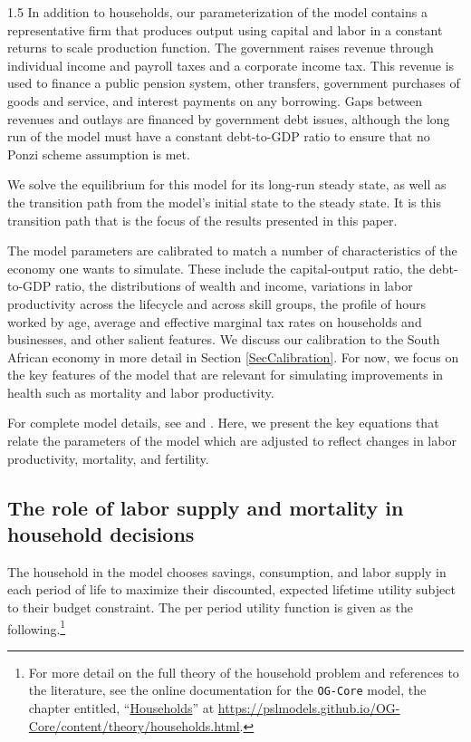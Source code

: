 \documentclass[letterpaper,12pt]{article}
\theoremstyle{definition}
\begin{document}
\begin{spacing}{1.5}
  In addition to households, our parameterization of the model contains a representative firm that produces output using capital and labor in a constant returns to scale production function.  The government raises revenue through individual income and payroll taxes and a corporate income tax.  This revenue is used to finance a public pension system, other transfers, government purchases of goods and service, and interest payments on any borrowing. Gaps between revenues and outlays are financed by government debt issues, although the long run of the model must have a constant debt-to-GDP ratio to ensure that no Ponzi scheme assumption is met.

  We solve the equilibrium for this model for its long-run steady state, as well as the transition path from the model's initial state to the steady state. It is this transition path that is the focus of the results presented in this paper.

  The model parameters are calibrated to match a number of characteristics of the economy one wants to simulate. These include the capital-output ratio, the debt-to-GDP ratio, the distributions of wealth and income, variations in labor productivity across the lifecycle and across skill groups, the profile of hours worked by age, average and effective marginal tax rates on households and businesses, and other salient features.  We discuss our calibration to the South African economy in more detail in Section \ref{SecCalibration}. For now, we focus on the key features of the model that are relevant for simulating improvements in health such as mortality and labor productivity.

  For complete model details, see \citet{OGCore} and \citet{DEP:2019}. Here, we present the key equations that relate the parameters of the model which are adjusted to reflect changes in labor productivity, mortality, and fertility.

    \subsection{The role of labor supply and mortality in household decisions}\label{SecLaborMort}

    The household in the model chooses savings, consumption, and labor supply in each period of life to maximize their discounted, expected lifetime utility subject to their budget constraint. The per period utility function is given as the following.\footnote{For more detail on the full theory of the household problem and references to the literature, see the online documentation for the \texttt{OG-Core} model, the chapter entitled, ``\href{https://pslmodels.github.io/OG-Core/content/theory/households.html}{Households}'' at \href{https://pslmodels.github.io/OG-Core/content/theory/households.html}{https://pslmodels.github.io/OG-Core/content/theory/households.html}.}


\end{spacing}
\end{document}
